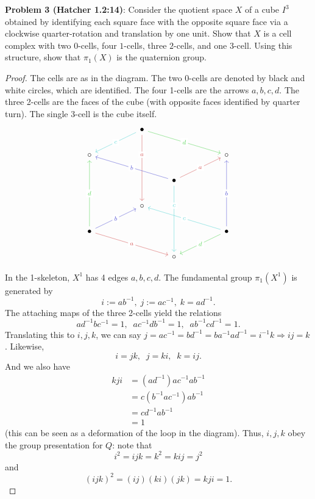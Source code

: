 \documentclass{amsart}
\begin{document}
\newpage
\textbf{Problem 3 (Hatcher 1.2:14)}: Consider the quotient space $X$ of a cube $I^3$ obtained by identifying each square face with the opposite square face via a clockwise quarter-rotation and translation by one unit. Show that $X$ is a cell complex with two $0$-cells, four $1$-cells, three $2$-cells, and one $3$-cell. Using this structure, show that $\pi_1(X)$ is the quaternion group.
\begin{proof}
	The cells are as in the diagram. The two 0-cells are denoted by black and white circles, which are identified. The four 1-cells are the arrows $a,b,c,d$. The three 2-cells are the faces of the cube (with opposite faces identified by quarter turn). The single 3-cell is the cube itself.
	$$
	\begin{tikzcd}
		&& \bullet \\
		\circ &&&&& \circ \\
		&&& \bullet \\
		&& \circ \\
		\bullet &&&&& \bullet \\
		&&& \circ
		\arrow["c"{description}, color={rgb,255:red,92;green,214;blue,214}, from=1-3, to=2-1]
		\arrow["d"{description}, color={rgb,255:red,92;green,214;blue,92}, from=1-3, to=2-6]
		\arrow["a"{description, pos=0.3}, color={rgb,255:red,214;green,92;blue,92}, from=1-3, to=4-3]
		\arrow["b"{description}, color={rgb,255:red,92;green,92;blue,214}, from=3-4, to=2-1]
		\arrow["a"{description}, color={rgb,255:red,214;green,92;blue,92}, from=3-4, to=2-6]
		\arrow["c"{description, pos=0.3}, color={rgb,255:red,92;green,214;blue,214}, from=3-4, to=6-4]
		\arrow["d"{description}, color={rgb,255:red,92;green,214;blue,92}, from=5-1, to=2-1]
		\arrow["b"{description}, color={rgb,255:red,92;green,92;blue,214}, from=5-1, to=4-3]
		\arrow["a"{description}, color={rgb,255:red,214;green,92;blue,92}, from=5-1, to=6-4]
		\arrow["b"{description}, color={rgb,255:red,92;green,92;blue,214}, from=5-6, to=2-6]
		\arrow["c"{description}, color={rgb,255:red,92;green,214;blue,214}, from=5-6, to=4-3]
		\arrow["d"{description}, color={rgb,255:red,92;green,214;blue,92}, from=5-6, to=6-4]
	\end{tikzcd}
	$$
	
	In the 1-skeleton, $X^1$ has 4 edges $a,b,c,d$. The fundamental group $\pi_1(X^1)$ is generated by 
	$$
	i := ab^{-1}, \; j := ac^{-1}, \; k = ad^{-1}.
	$$
	The attaching maps of the three 2-cells yield the relations
	$$
	ad^{-1}bc^{-1} = 1, \;\; ac^{-1}db^{-1}=1, \;\; ab^{-1}cd^{-1} = 1.
	$$
	Translating this to $i,j,k$, we can say $j = ac^{-1} = bd^{-1} = ba^{-1}ad^{-1} = i^{-1}k \Rightarrow ij = k$. Likewise,
	$$
	i = jk, \;\; j = ki, \;\; k = ij.
	$$
	And we also have 
	\begin{align*}
		kji &= (ad^{-1})ac^{-1}ab^{-1}\\
		&= c(b^{-1}ac^{-1})ab^{-1}\\
		&= cd^{-1}ab^{-1}\\
		&= 1
	\end{align*}
	(this can be seen as a deformation of the loop in the diagram). Thus, $i,j,k$ obey the group presentation for $Q$: note that
	$$
	i^2 = ijk = k^2 = kij = j^2
	$$
	and 
	$$
	(ijk)^2 = (ij)(ki)(jk) = kji = 1.
	$$
\end{proof}
\end{document}
